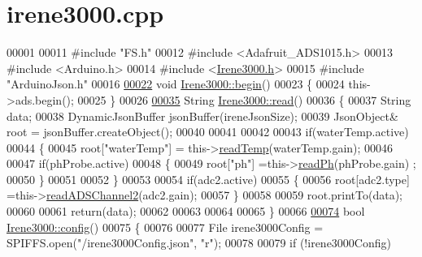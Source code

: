 \hypertarget{irene3000_8cpp_source}{}\section{irene3000.\+cpp}

\begin{DoxyCode}
00001 
00011 \textcolor{preprocessor}{#include "FS.h"}
00012 \textcolor{preprocessor}{#include <Adafruit\_ADS1015.h>}                                                                              
00013 \textcolor{preprocessor}{#include <Arduino.h>}
00014 \textcolor{preprocessor}{#include <\hyperlink{_irene3000_8h}{Irene3000.h}>}
00015 \textcolor{preprocessor}{#include "ArduinoJson.h"}
00016 
\hyperlink{class_irene3000_ad5891806c500ae1007afe52b9e304c2b}{00022} \textcolor{keywordtype}{void} \hyperlink{class_irene3000_ad5891806c500ae1007afe52b9e304c2b}{Irene3000::begin}()
00023 \{
00024     this->ads.begin();
00025 \}
00026 
\hyperlink{class_irene3000_a852a170feea994ea1df01c6b245b5d9a}{00035} String \hyperlink{class_irene3000_a852a170feea994ea1df01c6b245b5d9a}{Irene3000::read}()
00036 \{   
00037     String data;
00038     DynamicJsonBuffer jsonBuffer(ireneJsonSize);
00039     JsonObject& root = jsonBuffer.createObject();
00040 
00041 
00042         
00043     \textcolor{keywordflow}{if}(waterTemp.active)
00044     \{
00045         root[\textcolor{stringliteral}{"waterTemp"}] = this->\hyperlink{class_irene3000_a94ad40f281d83ad1be20bf1edd6fe802}{readTemp}(waterTemp.gain);
00046 
00047         \textcolor{keywordflow}{if}(phProbe.active)
00048         \{
00049             root[\textcolor{stringliteral}{"ph"}] =this->\hyperlink{class_irene3000_abf3db725fabb0634ec889b32068a5eec}{readPh}(phProbe.gain) ;
00050         \}
00051 
00052     \}
00053 
00054     \textcolor{keywordflow}{if}(adc2.active)
00055     \{
00056         root[adc2.type] =this->\hyperlink{class_irene3000_ae73bd2ed14a199a7e83f4d6458476a7c}{readADSChannel2}(adc2.gain);
00057     \}
00058     
00059     root.printTo(data);
00060     
00061     \textcolor{keywordflow}{return}(data);
00062     
00063     
00064 
00065 \}
00066 
\hyperlink{class_irene3000_afed5c35e4b23963c157847ef27c11e9c}{00074} \textcolor{keywordtype}{bool} \hyperlink{class_irene3000_afed5c35e4b23963c157847ef27c11e9c}{Irene3000::config}()
00075 \{
00076 
00077     File irene3000Config = SPIFFS.open(\textcolor{stringliteral}{"/irene3000Config.json"}, \textcolor{stringliteral}{"r"});
00078 
00079     \textcolor{keywordflow}{if} (!irene3000Config) 

\end{DoxyCode}
